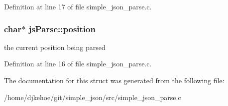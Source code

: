 Definition at line 17 of file simple\+\_\+json\+\_\+parse.\+c.

\subsubsection[{\texorpdfstring{position}{position}}]{\setlength{\rightskip}{0pt plus 5cm}char$\ast$ js\+Parse\+::position}\hypertarget{structjsParse_ace05b203435af05113a9a4b7c40f0324}{}\label{structjsParse_ace05b203435af05113a9a4b7c40f0324}
the current position being parsed 

Definition at line 16 of file simple\+\_\+json\+\_\+parse.\+c.



The documentation for this struct was generated from the following file\+:\begin{DoxyCompactItemize}
\item 
/home/djkehoe/git/simple\+\_\+json/src/simple\+\_\+json\+\_\+parse.\+c\end{DoxyCompactItemize}
